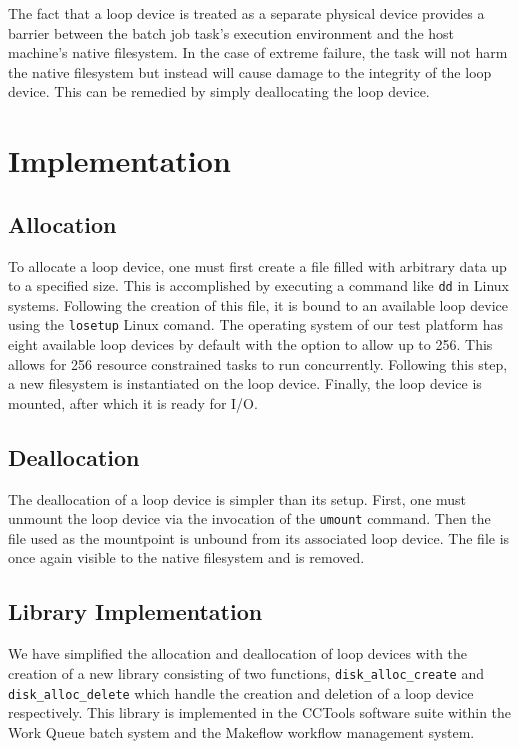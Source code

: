 \documentclass[conference]{IEEEtran}
\begin{document}
The fact that a loop device is treated as a separate physical device provides a barrier between the batch job task's execution environment and the host machine's native filesystem. In the case of extreme failure, the task will not harm the native filesystem but instead will cause damage to the integrity of the loop device. This can be remedied by simply deallocating the loop device.

\section{Implementation}

\subsection{Allocation}
To allocate a loop device, one must first create a file filled with arbitrary data up to a specified size. This is accomplished by executing a command like {\tt{dd}} in Linux systems. Following the creation of this file, it is bound to an available loop device using the {\tt{losetup}} Linux comand. The operating system of our test platform has eight available loop devices by default with the option to allow up to 256. This allows for 256 resource constrained tasks to run concurrently. Following this step, a new filesystem is instantiated on the loop device. Finally, the loop device is mounted, after which it is ready for I/O.

\subsection{Deallocation}
The deallocation of a loop device is simpler than its setup. First, one must unmount the loop device via the invocation of the {\tt{umount}} command. Then the file used as the mountpoint is unbound from its associated loop device. The file is once again visible to the native filesystem and is removed.

\subsection{Library Implementation}
We have simplified the allocation and deallocation of loop devices with the creation of a new library consisting of two functions, {\tt{disk\_alloc\_create}} and {\tt{disk\_alloc\_delete}} which handle the creation and deletion of a loop device respectively. This library is implemented in the CCTools software suite within the Work Queue batch system and the Makeflow workflow management system.
\end{document}
